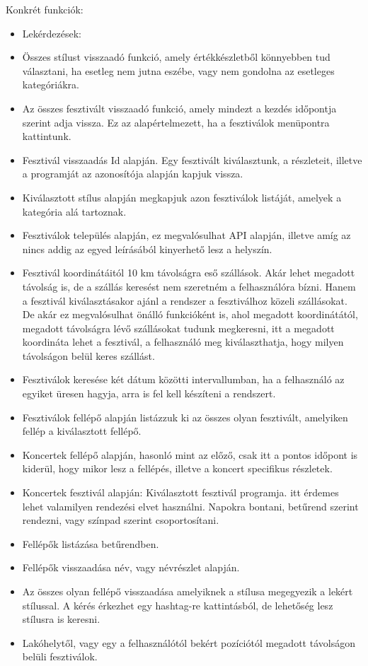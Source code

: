 Konkrét funkciók:
\begin{itemize}
\item Lekérdezések: %
\item Összes stílust visszaadó funkció, amely értékkészletből könnyebben tud választani, ha esetleg nem jutna eszébe, vagy nem gondolna az esetleges kategóriákra.
\item Az összes fesztivált visszaadó funkció, amely mindezt a kezdés időpontja szerint adja vissza. Ez az alapértelmezett, ha a fesztiválok menüpontra kattintunk.
\item Fesztivál visszaadás Id alapján. Egy fesztivált kiválasztunk, a részleteit, illetve a programját az azonosítója alapján kapjuk vissza. 
\item Kiválasztott stílus alapján megkapjuk azon fesztiválok listáját, amelyek a kategória alá tartoznak.
\item Fesztiválok település alapján, ez megvalósulhat API alapján, illetve amíg az nincs addig az egyed leírásából kinyerhető lesz a helyszín. 
\item Fesztivál koordinátáitól 10 km távolságra eső szállások. Akár lehet megadott távolság is, de a szállás keresést nem szeretném a felhasználóra bízni. Hanem a fesztivál kiválasztásakor ajánl a rendszer a fesztiválhoz közeli szállásokat. De akár ez megvalósulhat önálló funkcióként is, ahol megadott koordinátától, megadott távolságra lévő szállásokat tudunk megkeresni, itt a megadott koordináta lehet a fesztivál, a felhasználó meg kiválaszthatja, hogy milyen távolságon belül keres szállást.
\item Fesztiválok keresése két dátum közötti intervallumban, ha a felhasználó az egyiket üresen hagyja, arra is fel kell készíteni a rendszert.
\item Fesztiválok fellépő alapján listázzuk ki az összes olyan fesztivált, amelyiken fellép a kiválasztott fellépő.
\item Koncertek fellépő alapján, hasonló mint az előző, csak itt a pontos időpont is kiderül, hogy mikor lesz a fellépés, illetve a koncert specifikus részletek. %
\item Koncertek fesztivál alapján:  Kiválasztott fesztivál programja. itt érdemes lehet valamilyen rendezési elvet használni. Napokra bontani, betűrend szerint rendezni, vagy színpad szerint csoportosítani. %
\item Fellépők listázása betűrendben.
\item Fellépők visszaadása név, vagy névrészlet alapján.
\item Az összes olyan fellépő visszaadása amelyiknek a stílusa megegyezik a lekért stílussal. A kérés érkezhet egy hashtag-re kattintásból, de lehetőség lesz stílusra is keresni.
\item Lakóhelytől, vagy egy a felhasználótól bekért pozíciótól megadott távolságon belüli fesztiválok.


\end{itemize}
